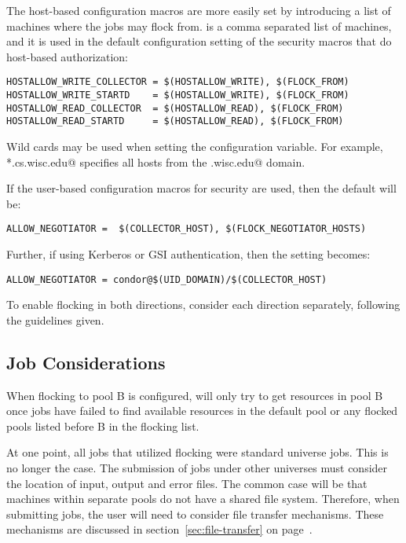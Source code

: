 The host-based configuration macros are more easily
set by introducing a list of machines where the jobs may flock from. 
 is a comma separated list of machines,
and  it is used in the default configuration setting
of the security macros that do host-based authorization:
\footnotesize
\begin{verbatim}
HOSTALLOW_WRITE_COLLECTOR = $(HOSTALLOW_WRITE), $(FLOCK_FROM)
HOSTALLOW_WRITE_STARTD    = $(HOSTALLOW_WRITE), $(FLOCK_FROM)
HOSTALLOW_READ_COLLECTOR  = $(HOSTALLOW_READ), $(FLOCK_FROM)
HOSTALLOW_READ_STARTD     = $(HOSTALLOW_READ), $(FLOCK_FROM)
\end{verbatim}
\normalsize

Wild cards may be used when setting the 
configuration variable.
For example, \verb@*.cs.wisc.edu@ specifies all hosts
from the \verb@cs.wisc.edu@ domain. 

If the user-based configuration macros for security are used,
then the default will be:
\footnotesize
\begin{verbatim}
ALLOW_NEGOTIATOR =  $(COLLECTOR_HOST), $(FLOCK_NEGOTIATOR_HOSTS)
\end{verbatim}
\normalsize

Further, if using Kerberos or GSI authentication, then the setting
becomes:
\footnotesize
\begin{verbatim}
ALLOW_NEGOTIATOR = condor@$(UID_DOMAIN)/$(COLLECTOR_HOST)
\end{verbatim}
\normalsize

To enable flocking in both directions, consider each direction
separately, following the guidelines given.

\subsection{\label{sec:Jobs-Flocking}Job Considerations}

When flocking to pool B is configured,  will only try
to get resources in pool B once jobs have failed to find available resources
in the default pool or any flocked pools listed before B in the flocking list.

At one point, all jobs that utilized flocking were standard
universe jobs.
This is no longer the case.
The submission of jobs under other universes must consider
the location of input, output and error files.
The common case will be that machines within separate pools
do not have a shared file system.
Therefore, when submitting jobs, the user will need to consider
file transfer mechanisms.
These mechanisms are discussed in
section~\ref{sec:file-transfer} on page~\pageref{sec:file-transfer}.

